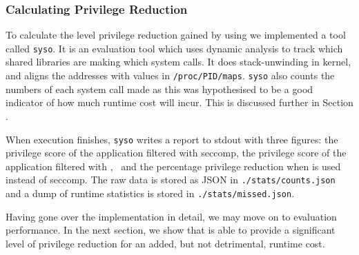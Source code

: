 \subsubsection{Calculating Privilege Reduction}

To calculate the level privilege reduction gained by using \af we implemented a
tool called \texttt{syso}. It is an evaluation tool which uses dynamic analysis
to track which shared libraries are making which system calls. It does
stack-unwinding in kernel, and aligns the addresses with values in
\texttt{/proc/PID/maps}. \texttt{syso} also counts the numbers of each system call 
made as this was hypothesised to be a good indicator of how much runtime cost
\af will incur. This is discussed further in Section .

When execution finishes, \texttt{syso} writes a report to \ac{stdout} with three
figures: the privilege score of the application filtered with seccomp, the
privilege score of the application filtered with \afss,~ and the percentage
privilege reduction when \af is used instead of seccomp. The raw data is stored
as JSON in \texttt{./stats/counts.json} and a dump of runtime statistics is
stored in \texttt{./stats/missed.json}.

Having gone over the implementation in detail, we may move on to evaluation
\afg performance. In the next section, we show that \af is able to provide a
significant level of privilege reduction for an added, but not detrimental,
runtime cost.
